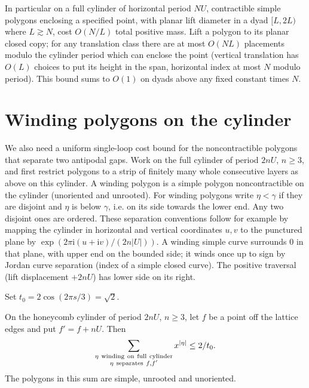 In particular on a full cylinder of horizontal period \(NU\), contractible simple polygons enclosing a specified point, with planar lift diameter in a dyad \([L,2L)\) where \(L\gtrsim N\), cost \(O(N/L)\) total positive mass. Lift a polygon to its planar closed copy; for any translation class there are at most \(O(NL)\) placements modulo the cylinder period which can enclose the point (vertical translation has \(O(L)\) choices to put its height in the span, horizontal index at most \(N\) modulo period). This bound sums to \(O(1)\) on dyads above any fixed constant times \(N\).

\section{Winding polygons on the cylinder}\label{c2:winding}

We also need a uniform single-loop cost bound for the noncontractible polygons that separate two antipodal gaps. Work on the full cylinder of period \(2nU\), \(n\ge3\), and first restrict polygons to a strip of finitely many whole consecutive layers as above on this cylinder. A winding polygon is a simple polygon noncontractible on the cylinder (unoriented and unrooted). For winding polygons write \(\eta<\gamma\) if they are disjoint and \(\eta\) is below \(\gamma\), i.e. on its side towards the lower end. Any two disjoint ones are ordered. These separation conventions follow for example by mapping the cylinder in horizontal and vertical coordinates \(u,v\) to the punctured plane by
\(\exp(2\pi \mathrm i(u+\mathrm i v)/(2n|U|))\). A winding simple curve surrounds 0 in that plane, with upper end on the bounded side; it winds once up to sign by Jordan curve separation (index of a simple closed curve). The positive traversal (lift displacement \(+2nU\)) has lower side on its right.

Set \(t_0=2\cos(2\pi s/3)=\sqrt2\).
\begin{proposition}
\label{prop:winding-separators}
On the honeycomb cylinder of period \(2nU\), \(n\ge3\), let \(f\) be a
point off the lattice edges and put \(f'=f+nU\). Then
\begin{equation}
 \sum_{\substack{\eta\ {\rm winding\ on\ full\ cylinder}\\
                 \eta\ {\rm separates}\ f,f'}} x^{|\eta|}
 \le 2/t_0.
 \label{c2:eq-C3}
\end{equation}
The polygons in this sum are simple, unrooted and unoriented.
\end{proposition}

